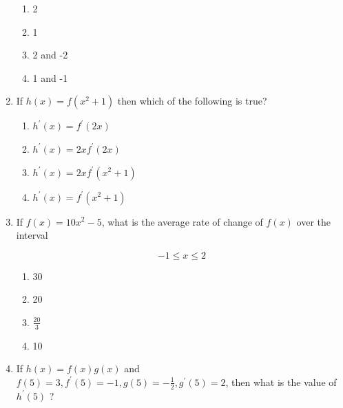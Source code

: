 \documentclass{article}
\begin{document}
\begin{enumerate}
\begin{minipage}[t]{\linewidth}
		\vspace{1em}

		\begin{enumerate}
		\setlength\itemsep{2em}
			\item  2 
			\item  1 
			\item  2 and -2 
			\item  1 and -1 
		\end{enumerate}
	\end{minipage}
	\item
	\begin{minipage}[t]{\linewidth}
		If \(h(x)=f\left(x^{2}+1\right)\) then which of the following is true?


		\vspace{1em}

		\begin{enumerate}
		\setlength\itemsep{2em}
			\item  $h^{\prime}(x)=f^{\prime}(2 x)$ 
			\item  $h^{\prime}(x)=2 x f^{\prime}(2 x)$ 
			\item  $h^{\prime}(x)=2 x f^{\prime}\left(x^{2}+1\right)$ 
			\item  $h^{\prime}(x)=f^{\prime}\left(x^{2}+1\right)$ 
		\end{enumerate}
	\end{minipage}
	\item
	\begin{minipage}[t]{\linewidth}
		If \(f(x)=10 x^{2}-5\), what is the average rate of change of \(f(x)\)
over the interval

\[
-1 \leq x \leq 2
\]


		\vspace{1em}

		\begin{enumerate}
		\setlength\itemsep{2em}
			\item  30 
			\item  20 
			\item  $\frac{20}{3}$ 
			\item  10 
		\end{enumerate}
	\end{minipage}
	\item
	\begin{minipage}[t]{\linewidth}
		If \(h(x)=f(x) g(x)\) and
\(f(5)=3, f^{\prime}(5)=-1, g(5)=-\frac{1}{2}, g^{\prime}(5)=2\), then
what is the value of \(h^{\prime}(5)\) ?


		\vspace{1em}


\end{minipage}
\end{enumerate}
\end{document}
